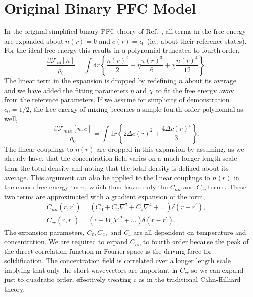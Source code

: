 \documentclass[showkeys, prb, reprint]{revtex4-1}
\renewcommand{\d}{\delta}       %
\newcommand{\F}{\mathcal{F}}    %
\renewcommand{\l}{\left}        %
\renewcommand{\r}{\right}       %
\newcommand{\f}{\frac}          %
\newcommand{\integrate}[1]{\int\!\mathrm{d}#1}
\begin{document}
\section{Original Binary PFC Model} %

In the original  simplified binary PFC theory of Ref.~\cite{ELDER07}, all terms in the free energy are expanded about $n(r) = 0$ and $c(r) = c_0$ (ie., about their reference states).
For the ideal free energy this results in a polynomial truncated to fourth
order,
%
\begin{equation}
    \label{ideal_expansion}
    \f{\beta\F_{id}[n]}{\rho_0} = \integrate{r}
    \l\lbrace \f{n(r)^2}{2} - \eta\f{n(r)^3}{6} + \chi\f{n(r)^4}{12} \r\rbrace.
\end{equation}
%
The linear term in the expansion is dropped by redefining $n$ about its average
and we have added the fitting parameters $\eta$ and $\chi$ to fit the free
energy away from the reference parameters. If we assume for simplicity of
demonstration $c_0 = 1/2$, the free energy of mixing becomes a simple fourth
order polynomial as well,
%
\begin{equation}
    \f{\beta\F_{mix}[n, c]}{\rho_0} = \integrate{r} \l\lbrace
       2\Delta c(r)^2 + \f{4\Delta c(r)^4}{3}
    \r\rbrace.
\end{equation}
%
The linear couplings to $n(r)$ are dropped in this expansion by assuming, as we already have, that the concentration field varies on a much longer length scale than the total density and noting that the total density is defined about its average. This
argument can also be applied to the linear couplings to $n(r)$ in the excess free
energy term, which then leaves only the $C_{nn}$ and $C_{cc}$ terms. These
two terms are approximated with a gradient expansion of the form,
%
\begin{gather}
    C_{nn}(r, r^\prime) = \l( C_0 + C_2 \nabla^2 + C_4 \nabla^4 + \dots\r)
        \d(r - r^\prime), \\
    C_{cc}(r, r^\prime) = \l(\epsilon + W_c \nabla^2 + \dots\r)
        \d(r - r^\prime).
\end{gather}
%
The expansion parameters, $C_0, C_2,$ and $C_4$ are all dependent on
temperature and concentration. We are required to expand $C_{nn}$ to fourth
order because the peak of the direct correlation function in Fourier space is
the driving force for solidification.  The concentration field is correlated
over a longer length scale implying that only the short wavevectors are
important in $C_{cc}$ so we can expand just to quadratic order, effectively
treating $c$ as in the traditional Cahn-Hilliard theory.
\end{document}
